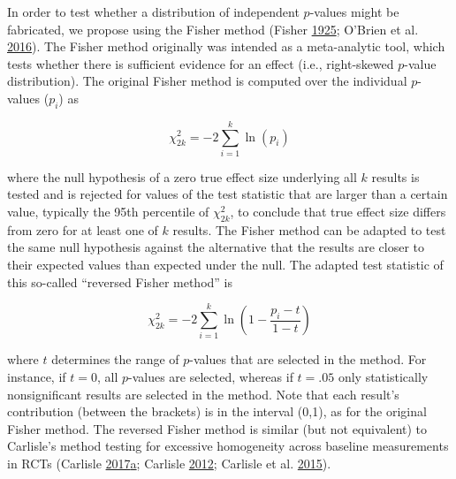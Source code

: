 \documentclass[a5paper]{book}
\begin{document}
In order to test whether a distribution of independent \(p\)-values
might be fabricated, we propose using the Fisher method (Fisher
\protect\hyperlink{ref-Fisher1925-jl}{1925}; O'Brien et al.
\protect\hyperlink{ref-doi:10.1186ux2fs41073-016-0012-9}{2016}). The
Fisher method originally was intended as a meta-analytic tool, which
tests whether there is sufficient evidence for an effect (i.e.,
right-skewed \(p\)-value distribution). The original Fisher method is
computed over the individual \(p\)-values (\(p_i\)) as

\begin{equation}
\chi^2_{2k}=-2\sum\limits^k_{i=1}\ln(p_i)
\label{eq:fisher}
\end{equation}

where the null hypothesis of a zero true effect size underlying all
\(k\) results is tested and is rejected for values of the test statistic
that are larger than a certain value, typically the 95th percentile of
\(\chi^2_{2k}\), to conclude that true effect size differs from zero for
at least one of \(k\) results. The Fisher method can be adapted to test
the same null hypothesis against the alternative that the results are
closer to their expected values than expected under the null. The
adapted test statistic of this so-called \enquote{reversed Fisher
method} is

\begin{equation}
\chi^2_{2k}=-2\sum\limits^k_{i=1}\ln(1-\frac{p_i-t}{1-t})
\label{eq:revfisher}
\end{equation}

where \(t\) determines the range of \(p\)-values that are selected in
the method. For instance, if \(t=0\), all \(p\)-values are selected,
whereas if \(t=.05\) only statistically nonsignificant results are
selected in the method. Note that each result's contribution (between
the brackets) is in the interval (0,1), as for the original Fisher
method. The reversed Fisher method is similar (but not equivalent) to
Carlisle's method testing for excessive homogeneity across baseline
measurements in RCTs (Carlisle
\protect\hyperlink{ref-doi:10.1111ux2fanae.13938}{2017}\protect\hyperlink{ref-doi:10.1111ux2fanae.13938}{a};
Carlisle
\protect\hyperlink{ref-doi:10.1111ux2fj.1365-2044.2012.07128.x}{2012};
Carlisle et al.
\protect\hyperlink{ref-doi:10.1111ux2fanae.13126}{2015}).
\end{document}
